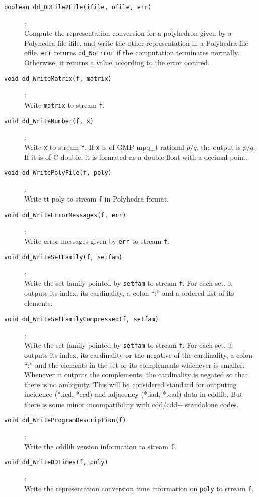 \documentclass[11pt]{article}
\newcommand {\0} {{\bf 0}}
\begin{document}
\begin{description}

\item[{\tt boolean dd\_DDFile2File(ifile, ofile, err)}]:\\
Compute the representation conversion for a polyhedron given
by a Polyhedra file ifile, and write the other representation
in a Polyhedra file ofile.  {\tt *err}
returns {\tt dd\_NoError} if the computation terminates normally.  Otherwise,
it returns a value according to the error occured.

\item[{\tt void dd\_WriteMatrix(f, matrix)}]:\\
Write {\tt  matrix} to stream {\tt f}.

\item[{\tt void dd\_WriteNumber(f, x)}]:\\
Write {\tt x} to stream {\tt f}.  If {\tt x} is of GMP mpq\_t rational $p/q$,
the output is $p/q$.  If it is of C double, it is formated as a double float
with a decimal point.

\item[{\tt void dd\_WritePolyFile(f, poly)}]:\\
Write {tt poly} to stream {\tt f} in Polyhedra format.

\item[{\tt void dd\_WriteErrorMessages(f, err)}]:\\
Write error messages given by {\tt err} to stream {\tt f}.

\item[{\tt void dd\_WriteSetFamily(f, setfam)}]:\\
Write the set family pointed by {\tt setfam} to stream {\tt f}.
For each set, it outputs its index, its cardinality,
a colon ``:'' and a ordered list of its elements.

\item[{\tt void dd\_WriteSetFamilyCompressed(f, setfam)}]:\\
Write the set family pointed by {\tt setfam} to stream {\tt f}.
For each set, it outputs its index, its cardinality or the
negative of the cardinality, a colon ``:''
 and the elements in the set or its complements whichever is smaller.
Whenever it outputs the complements, the cardinality is negated
so that there is no ambiguity.
This will be considered standard for
outputing incidence (*.icd, *ecd) and adjacency 
(*.iad, *.ead) data in cddlib.   But there is some minor incompatibility
with cdd/cdd+ standalone codes.

\item[{\tt void dd\_WriteProgramDescription(f)}]:\\
Write the cddlib version information to stream {\tt f}.

\item[{\tt void dd\_WriteDDTimes(f, poly)}]:\\
Write the representation conversion time information on {\tt poly}
 to stream {\tt f}.

\end{description}
\end{document}
